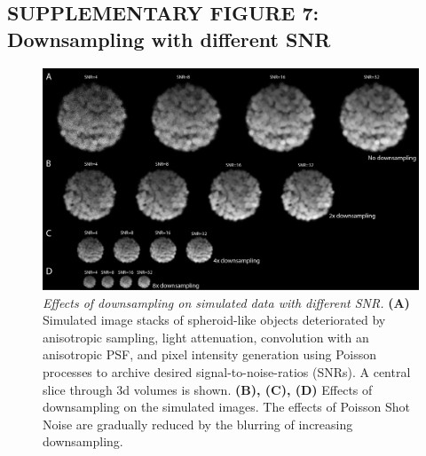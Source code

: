 \documentclass[]{spie}  %
\begin{document}
\subsection*{SUPPLEMENTARY FIGURE 7: Downsampling with different SNR}
\vspace{1mm}
\begin{figure}[h!]
\includegraphics[width=\textwidth]{fig-downsampling.png}
\vspace{-2.0mm}
\caption{\hspace{-0.5mm} \emph{Effects of downsampling on simulated data with different SNR.} \textbf{(A)} Simulated image stacks of spheroid-like objects deteriorated by anisotropic sampling, light attenuation, convolution with an anisotropic PSF, and pixel intensity generation using Poisson processes to archive desired signal-to-noise-ratios (SNRs). A central slice through 3d volumes is shown. \textbf{(B), (C), (D)} Effects of downsampling on the simulated images. The effects of Poisson Shot Noise are gradually reduced by the blurring of increasing downsampling.
}
\label{fig:sup-fig-downsampling}
\end{figure}

\pagebreak
\end{document}
